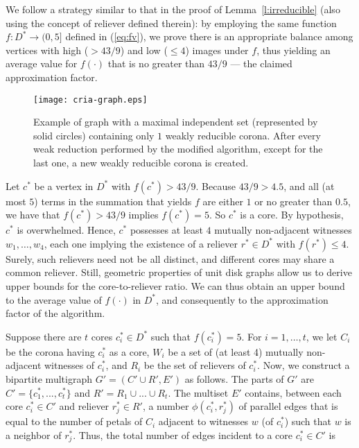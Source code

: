 \documentclass[preprint,12pt]{elsarticle}
\begin{document}
\begin{pf}
We follow a strategy similar to that in the proof of Lemma~\ref{l:irreducible} (also using the concept of reliever defined therein): by employing the same function
 ${f : D^* \to (0,5]}$ defined in (\ref{eq:fv}),
we prove there is an appropriate balance among vertices
with high ($> 43/9$) and low ($\leq 4$) images under $f$, thus yielding an average value for $f(\cdot)$ that is no greater than $43/9$ --- the claimed approximation factor.

\begin{figure}
 \centering
 \texttt{[image: cria-graph.eps]}
 \caption{\label{f:newcoronas}Example of graph with a maximal independent set (represented by solid circles) containing only $1$ weakly reducible corona. After every weak reduction performed by the modified algorithm, except for the last one, a new weakly reducible corona is created.}
\end{figure}

Let $c^*$ be a vertex in $D^*$ with $f(c^*) > 43/9$. Because $43/9 > 4.5$, and all (at most $5$) terms in the summation that yields $f$ are either $1$ or no greater than $0.5$, we have that $f(c^*) > 43/9$ implies $f(c^*) = 5$. So $c^*$ is a core.
By hypothesis, $c^*$ is overwhelmed. Hence, $c^*$ possesses at least $4$ mutually non-adjacent witnesses $w_1, \ldots, w_4$, each one implying the existence of a reliever $r^* \in D^*$ with $f(r^*) \leq 4$. Surely, such relievers need not be all distinct, and different cores may share a common reliever.
Still, geometric properties of unit disk graphs allow us to derive upper bounds for the core-to-reliever ratio. We can thus obtain an upper bound to the average value of $f(\cdot)$ in $D^*$, and consequently to the approximation factor of the algorithm.

Suppose there are $t$ cores $c^*_i \in D^*$ such that $f(c^*_i) = 5$. For $i = 1, \dots, t$, we let $C_i$ be the corona having $c^*_i$ as a core, $W_i$ be a set of (at least 4) mutually non-adjacent witnesses of $c^*_i$, and $R_i$ be the set of relievers of $c^*_i$. Now, we construct a bipartite multigraph $G'=(C' \cup R', E')$ as follows. The parts of $G'$ are $C'=\{c^*_1,...,c^*_t\}$ and $R'=R_1\cup...\cup R_t$. The multiset $E'$ contains, between each core $c^*_i \in C'$ and reliever $r^*_j \in R'$, a number $\phi(c^*_i, r^*_j)$ of parallel edges that is equal to the number of petals of $C_i$ adjacent to witnesses $w$ \linebreak (of $c^*_i$) such that $w$ is a neighbor of $r^*_j$.
Thus, the total number of edges incident to a core $c^*_i \in C'$ is


\end{pf}
\end{document}
